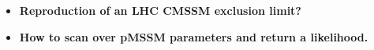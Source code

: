 
\begin{itemize}
\item \textbf{Reproduction of an LHC CMSSM exclusion limit?}
\item \textbf{How to scan over pMSSM parameters and return a likelihood.}

\end{itemize}
